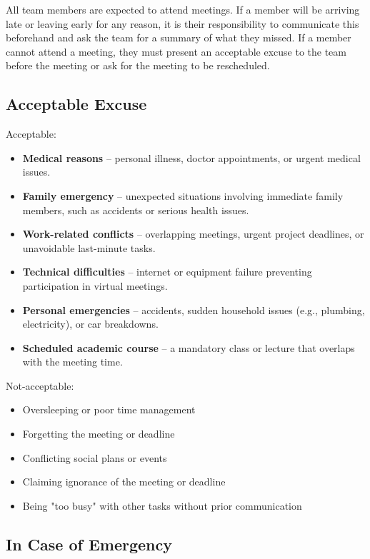 \documentclass{article}
\begin{document}
All team members are expected to attend meetings. If a member will be arriving late or leaving early for any reason, it is their responsibility to communicate this beforehand and ask the team for a summary of what they missed. If a member cannot attend a meeting, they must present an acceptable excuse to the team before the meeting or ask for the meeting to be rescheduled.

\subsection{Acceptable Excuse}


Acceptable:\\
\begin {itemize}
    \item \textbf{Medical reasons} – personal illness, doctor appointments, or urgent medical issues.
    \item \textbf{Family emergency} – unexpected situations involving immediate family members, such as accidents or serious health issues.
    \item \textbf{Work-related conflicts} – overlapping meetings, urgent project deadlines, or unavoidable last-minute tasks. 
    \item \textbf{Technical difficulties} – internet or equipment failure preventing participation in virtual meetings.
    \item \textbf{Personal emergencies} – accidents, sudden household issues (e.g., plumbing, electricity), or car breakdowns.
    \item \textbf{Scheduled academic course} – a mandatory class or lecture that overlaps with the meeting time.
\end{itemize}


Not-acceptable:\\

\begin{itemize}
    \item Oversleeping or poor time management
    \item Forgetting the meeting or deadline
    \item Conflicting social plans or events
    \item Claiming ignorance of the meeting or deadline
    \item Being "too busy" with other tasks without prior communication
\end{itemize}

\subsection{In Case of Emergency}
\end{document}
